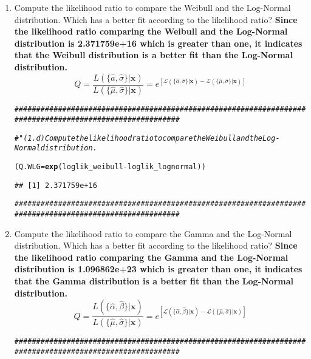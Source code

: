 \documentclass{article}\usepackage[]{graphicx}\usepackage[]{xcolor}
\makeatletter
\newcommand{\hlcom}[1]{\textcolor[rgb]{0.678,0.584,0.686}{\textit{#1}}}%
\newcommand{\hlopt}[1]{\textcolor[rgb]{0,0,0}{#1}}%
\newcommand{\hldef}[1]{\textcolor[rgb]{0.345,0.345,0.345}{#1}}%
\newcommand{\hlkwb}[1]{\textcolor[rgb]{0.69,0.353,0.396}{#1}}%
\newcommand{\hlkwd}[1]{\textcolor[rgb]{0.737,0.353,0.396}{\textbf{#1}}}%
\newenvironment{kframe}{%
 \def\at@end@of@kframe{}%
 \ifinner\ifhmode%
  \def\at@end@of@kframe{\end{minipage}}%
  \begin{minipage}{\columnwidth}%
 \fi\fi%
 \def\FrameCommand##1{\hskip\@totalleftmargin \hskip-\fboxsep
 \colorbox{shadecolor}{##1}\hskip-\fboxsep
     \hskip-\linewidth \hskip-\@totalleftmargin \hskip\columnwidth}%
 \MakeFramed {\advance\hsize-\width
   \@totalleftmargin\z@ \linewidth\hsize
   \@setminipage}}%
 {\par\unskip\endMakeFramed%
 \at@end@of@kframe}
\newenvironment{knitrout}{}{} %
\makeatother
\begin{document}
\begin{enumerate}
\begin{enumerate}
    
    \item Compute the likelihood ratio to compare the Weibull and the Log-Normal distribution.
    Which has a better fit according to the likelihood ratio? \textbf{Since the likelihood ratio comparing the Weibull and the Log-Normal distribution is 2.371759e+16 which is greater than one, it indicates that the Weibull distribution is a better fit than the Log-Normal distribution.}
    \[Q = \frac{L(\{\hat{a}, \hat{\sigma}\}|\mathbf{x})}{L(\{\hat{\mu}, \hat{\sigma}\}|\mathbf{x})}=e^{\left[\mathcal{L}(\{\hat{a}, \hat{\sigma}\}|\mathbf{x}) - \mathcal{L}(\{\hat{\mu}, \hat{\sigma}\}|\mathbf{x})\right]}\]
    
\begin{knitrout}\scriptsize
{}\color{fgcolor}\begin{kframe}
\begin{alltt}
\hlcom{#########################################################################################################}

\hlcom{# "(1.d)  Compute the likelihood ratio to compare the Weibull and the Log-Normal distribution.  }

\hldef{(Q.WLG} \hlkwb{=} \hlkwd{exp}\hldef{(loglik_weibull} \hlopt{-} \hldef{loglik_lognormal))}
\end{alltt}
\begin{verbatim}
## [1] 2.371759e+16
\end{verbatim}
\begin{alltt}
\hlcom{#########################################################################################################}
\end{alltt}
\end{kframe}
\end{knitrout}
    
    \item Compute the likelihood ratio to compare the Gamma and the Log-Normal distribution.
    Which has a better fit according to the likelihood ratio? \textbf{Since the likelihood ratio comparing the Gamma and the Log-Normal distribution is 1.096862e+23 which is greater than one, it indicates that the Gamma distribution is a better fit than the Log-Normal distribution.}
    \[Q = \frac{L(\{\hat{\alpha}, \hat{\beta}\}|\mathbf{x})}{L(\{\hat{\mu}, \hat{\sigma}\}|\mathbf{x})}=e^{\left[\mathcal{L}(\{\hat{\alpha}, \hat{\beta}\}|\mathbf{x}) - \mathcal{L}(\{\hat{\mu}, \hat{\sigma}\}|\mathbf{x})\right]}\]
    
\begin{knitrout}\scriptsize
{}\color{fgcolor}\begin{kframe}
\begin{alltt}
\hlcom{#########################################################################################################}


\end{alltt}
\end{kframe}
\end{knitrout}
\end{enumerate}
\end{enumerate}
\end{document}
